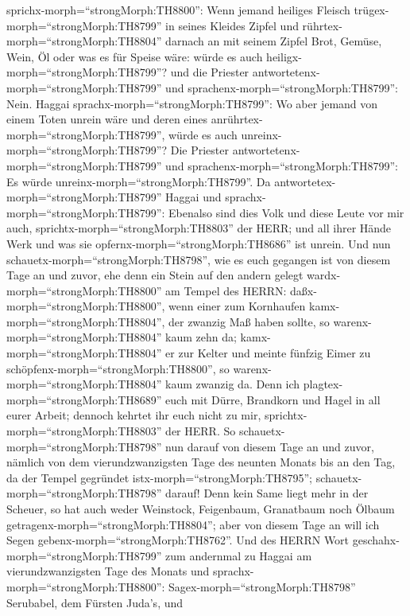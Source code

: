 sprichx-morph=``strongMorph:TH8800'':  Wenn jemand heiliges
Fleisch trügex-morph=``strongMorph:TH8799'' in seines Kleides Zipfel und
rührtex-morph=``strongMorph:TH8804'' darnach an mit seinem Zipfel Brot,
Gemüse, Wein, Öl oder was es für Speise wäre: würde es auch
heiligx-morph=``strongMorph:TH8799''? und die Priester
antwortetenx-morph=``strongMorph:TH8799'' und
sprachenx-morph=``strongMorph:TH8799'': Nein.  Haggai
sprachx-morph=``strongMorph:TH8799'': Wo aber jemand von einem Toten
unrein wäre und deren eines anrührtex-morph=``strongMorph:TH8799'',
würde es auch unreinx-morph=``strongMorph:TH8799''? Die Priester
antwortetenx-morph=``strongMorph:TH8799'' und
sprachenx-morph=``strongMorph:TH8799'': Es würde
unreinx-morph=``strongMorph:TH8799''.  Da
antwortetex-morph=``strongMorph:TH8799'' Haggai und
sprachx-morph=``strongMorph:TH8799'': Ebenalso sind dies Volk und diese
Leute vor mir auch, sprichtx-morph=``strongMorph:TH8803'' der HERR; und
all ihrer Hände Werk und was sie opfernx-morph=``strongMorph:TH8686''
ist unrein.  Und nun schauetx-morph=``strongMorph:TH8798'',
wie es euch gegangen ist von diesem Tage an und zuvor, ehe denn ein
Stein auf den andern gelegt wardx-morph=``strongMorph:TH8800'' am Tempel
des HERRN:  daßx-morph=``strongMorph:TH8800'', wenn einer
zum Kornhaufen kamx-morph=``strongMorph:TH8804'', der zwanzig Maß haben
sollte, so warenx-morph=``strongMorph:TH8804'' kaum zehn da;
kamx-morph=``strongMorph:TH8804'' er zur Kelter und meinte fünfzig Eimer
zu schöpfenx-morph=``strongMorph:TH8800'', so
warenx-morph=``strongMorph:TH8804'' kaum zwanzig da.  Denn
ich plagtex-morph=``strongMorph:TH8689'' euch mit Dürre, Brandkorn und
Hagel in all eurer Arbeit; dennoch kehrtet ihr euch nicht zu mir,
sprichtx-morph=``strongMorph:TH8803'' der HERR.  So
schauetx-morph=``strongMorph:TH8798'' nun darauf von diesem Tage an und
zuvor, nämlich von dem vierundzwanzigsten Tage des neunten Monats bis an
den Tag, da der Tempel gegründet istx-morph=``strongMorph:TH8795'';
schauetx-morph=``strongMorph:TH8798'' darauf!  Denn kein
Same liegt mehr in der Scheuer, so hat auch weder Weinstock, Feigenbaum,
Granatbaum noch Ölbaum getragenx-morph=``strongMorph:TH8804''; aber von
diesem Tage an will ich Segen gebenx-morph=``strongMorph:TH8762''.
 Und des HERRN Wort geschahx-morph=``strongMorph:TH8799''
zum andernmal zu Haggai am vierundzwanzigsten Tage des Monats und
sprachx-morph=``strongMorph:TH8800'': 
Sagex-morph=``strongMorph:TH8798'' Serubabel, dem Fürsten Juda's, und
